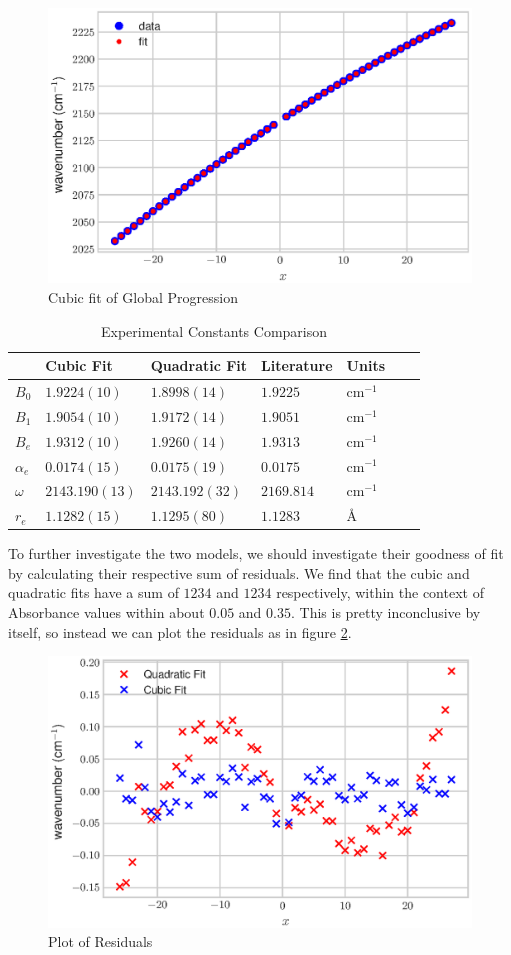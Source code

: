 \documentclass[aps,prl,reprint,10pt,amsmath,amssymb,superscriptaddress,a4paper]{revtex4-2}
\begin{document}
\begin{figure}[H]
\includegraphics[width = 8 cm]{CubeFit.eps}
\caption{Cubic fit of Global Progression}
\label{fig:Cubic}
\end{figure}

\begin{table}[h]
\begin{tabular}{@{}lllllll@{}}
\toprule
                         & Cubic Fit    		& Quadratic Fit 		& Literature	&Units		& \\ \midrule
$B_0$          	& $1.9224(10)$       	& $1.8998(14)$         &$1.9225$ 	&cm$^{-1}$	& \\ 
$B_1$   		& $1.9054 (10)$      	& $1.9172(14)$         &$1.9051$	&cm$^{-1}$	& \\ 
$B_e$    		& $1.9312(10)$       	& $1.9260(14)$         &$1.9313$ 	&cm$^{-1}$	& \\
$\alpha_e$    	& $0.0174(15)$       	& $0.0175(19)$         &$0.0175$ 	&cm$^{-1}$	& \\ 
$\omega$ 	& $2143.190(13)$  	& $2143.192(32)$ 	&$2169.814$ 	&cm$^{-1}$	& \\ 
$r_e$   		& $1.1282(15)$       	& $1.1295(80)$         &$1.1283$	&\AA			& \\ \bottomrule
\end{tabular}
\caption{Experimental Constants Comparison \cite{NIST}\cite{MolSpectra}\cite{Education}}
\label{tab:results}
\end{table}

\pagebreak

To further investigate the two models, we should investigate their goodness of fit by calculating their respective sum of residuals. We find that the cubic and quadratic fits have a sum of $1234$ and $1234$ respectively, within the context of Absorbance values within about $0.05$ and $0.35$. This is pretty inconclusive by itself, so instead we can plot the residuals as in figure \ref{fig:Residuals}.

\begin{figure}[h]
\includegraphics[width = 8 cm]{Residuals.eps}
\caption{Plot of Residuals}
\label{fig:Residuals}
\end{figure}
\end{document}
